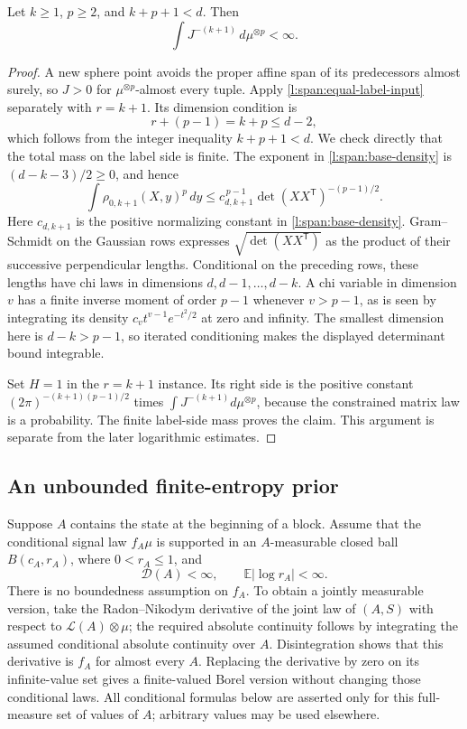 \begin{lemma}
\label{l:span:extra-moment}
Let \(k\ge1\), \(p\ge2\), and \(k+p+1<d\).  Then
\[
 \int J^{-(k+1)}\,d\mu^{\otimes p}<\infty.
\]
\end{lemma}
\begin{proof}
A new sphere point avoids the proper affine span of its predecessors
almost surely, so \(J>0\) for \(\mu^{\otimes p}\)-almost every tuple.
Apply \eqref{l:span:equal-label-input} separately with \(r=k+1\).
Its dimension condition is
\[
 r+(p-1)=k+p\le d-2,
\]
which follows from the integer inequality \(k+p+1<d\).
We check directly that the total mass on the label side is finite.
The exponent in \eqref{l:span:base-density} is
\((d-k-3)/2\ge0\), and hence
\[
 \int \rho_{0,k+1}(X,y)^p\,dy
 \le c_{d,k+1}^{\,p-1}
       \det(XX^{\mathsf T})^{-(p-1)/2}.
\]
Here \(c_{d,k+1}\) is the positive normalizing constant in
\eqref{l:span:base-density}.  Gram--Schmidt on the Gaussian rows
expresses \(\sqrt{\det(XX^{\mathsf T})}\) as the product of their
successive perpendicular lengths.  Conditional on the preceding
rows, these lengths have chi laws in dimensions
\(d,d-1,\ldots,d-k\).  A chi variable in dimension \(v\) has a finite
inverse moment of order \(p-1\) whenever \(v>p-1\), as is seen by
integrating its density \(c_v t^{v-1}e^{-t^2/2}\) at zero and infinity.
The smallest dimension here is \(d-k>p-1\), so iterated conditioning
makes the displayed determinant bound integrable.

Set \(H=1\) in the \(r=k+1\) instance.  Its right side is the positive
constant \((2\pi)^{-(k+1)(p-1)/2}\) times
\(\int J^{-(k+1)}d\mu^{\otimes p}\), because the constrained matrix
law is a probability.  The finite label-side mass proves the claim.
This argument is separate from the later logarithmic estimates.
\end{proof}

\subsection{An unbounded finite-entropy prior}

Suppose \(A\) contains the state at the beginning of a block.  Assume
that the conditional signal law \(f_A\mu\) is supported in an
\(A\)-measurable closed ball \(B(c_A,r_A)\), where \(0<r_A\le1\), and
\begin{equation}
 \mathcal D(A)<\infty,\qquad
 \mathbb E|\log r_A|<\infty.
 \label{l:span:incoming}
\end{equation}
There is no boundedness assumption on \(f_A\).  To obtain a jointly
measurable version, take the Radon--Nikodym derivative of the joint
law of \((A,S)\) with respect to \(\mathcal L(A)\otimes\mu\);
the required absolute continuity follows by integrating the assumed
conditional absolute continuity over \(A\).  Disintegration shows
that this derivative is \(f_A\) for almost every \(A\).  Replacing
the derivative by zero on its infinite-value set gives a finite-valued
Borel version without changing those conditional laws.  All
conditional formulas below are asserted only for this full-measure
set of values of \(A\); arbitrary values may be used elsewhere.

